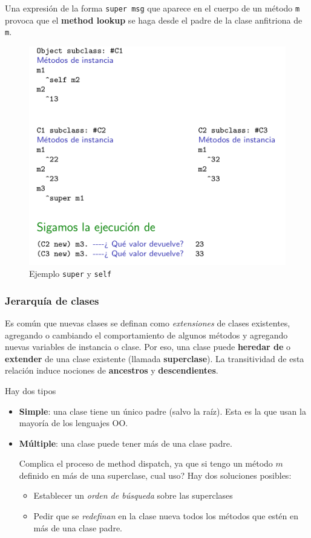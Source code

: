 \documentclass{report}
\theoremstyle{definition} %
\begin{document}
Una expresión de la forma \texttt{super msg} que aparece en el cuerpo de un
método \texttt{m} provoca que el \textbf{method lookup} se haga desde el padre
de la clase anfitriona de \texttt{m}.

\begin{figure}[H]
    \centering
    \includegraphics[scale=0.25]{img/poo/st-super-self.png}
    \caption{Ejemplo \texttt{super} y \texttt{self}}
\end{figure}

\subsubsection{Jerarquía de clases}

Es común que nuevas clases se definan como \textit{extensiones} de clases
existentes, agregando o cambiando el comportamiento de algunos métodos y
agregando nuevas variables de instancia o clase. Por eso, una clase puede
\textbf{heredar de} o \textbf{extender} de una clase existente (llamada
\textbf{superclase}). La transitividad de esta relación induce nociones de
\textbf{ancestros} y \textbf{descendientes}.

Hay dos tipos

\begin{itemize}
    \item \textbf{Simple}: una clase tiene un único padre (salvo la raíz). Esta
    es la que usan la mayoría de los lenguajes OO.
    \item \textbf{Múltiple}: una clase puede tener más de una clase padre.
    
    Complica el proceso de method dispatch, ya que si tengo un método $m$
    definido en más de una superclase, cual uso? Hay dos soluciones posibles:
    \begin{itemize}
        \item Establecer un \textit{orden de búsqueda} sobre las superclases
        \item Pedir que se \textit{redefinan} en la clase nueva todos los
        métodos que estén en más de una clase padre.
    \end{itemize}
    
\end{itemize}
\end{document}
